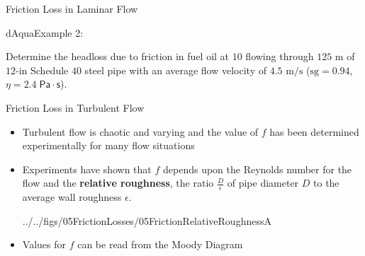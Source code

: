\documentclass[9pt,xcolor=x11names,professionalfonts, mathserif]{beamer}
\begin{document}
\begin{frame}{Friction Loss in Laminar Flow}
\end{frame}

\begin{frame}
	\begin{cmini}[0.65]{
		\begin{cb}[10]{dAqua}{Example 2:}{
			Determine the headloss due to friction in fuel oil at $10$\textcelsius{} flowing through $125\text{ m}$
			of $12$-in Schedule $40$ steel pipe with an average flow velocity of $4.5\text{ m/s}$ ($\text{sg}=0.94$, $\eta=2.4\;\mathsf{Pa\cdot s}$).\par\medskip
		}\end{cb}
	}\end{cmini}
\end{frame}

\begin{frame}{Friction Loss in Turbulent Flow}

		\begin{itemize}
		  \item Turbulent flow is chaotic and varying and the value of $f$ has been determined experimentally
		  for many flow situations
		  \item Experiments have shown that $f$ depends upon the Reynolds number for the flow and the \textbf{relative roughness},
		  the ratio $\tfrac{D}{\epsilon}$ of pipe diameter $D$ to the average wall roughness $\epsilon$.\par\medskip
		  \begin{cfig}[0.5]{../../figs/05FrictionLosses/05FrictionRelativeRoughnessA}\end{cfig}
		  \item Values for $f$ can be read from the Moody Diagram
		\end{itemize}
\end{frame}
\end{document}
